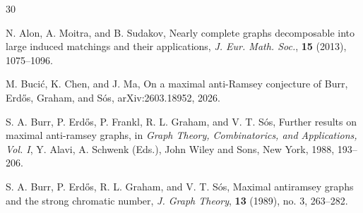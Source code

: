 \documentclass[11pt,a4paper]{article}
\begin{document}


\begin{thebibliography}{30}


 N. Alon, A. Moitra, and B. Sudakov, Nearly complete graphs decomposable into large induced matchings and their applications, \emph{J. Eur. Math. Soc.}, \textbf{15} (2013), 1075--1096.

 M. Buci\'{c}, K. Chen, and J. Ma, On a maximal anti-Ramsey conjecture of Burr, Erd\H{o}s, Graham, and S\'{o}s, arXiv:2603.18952, 2026.


 S. A. Burr, P. Erd\H{o}s, P. Frankl, R. L. Graham, and V. T. S\'{o}s, Further results on maximal anti-ramsey graphs, in \emph{Graph Theory, Combinatorics, and Applications, Vol. I}, Y. Alavi, A. Schwenk (Eds.), John Wiley and Sons, New York, 1988, 193--206.

 S. A. Burr, P. Erd\H{o}s, R. L. Graham, and V. T. S\'{o}s, Maximal antiramsey graphs and the strong chromatic number, \emph{J. Graph Theory}, \textbf{13} (1989), no. 3, 263--282.






\end{thebibliography}
\end{document}
